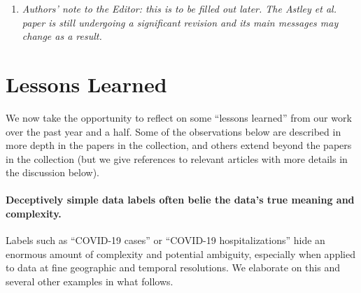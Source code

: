 \documentclass{article}
\begin{document}
\begin{enumerate}
\item \emph{Authors' note to the Editor: this is to be filled out later.  The
    Astley et al. paper is still undergoing a significant revision and its main
    messages may change as a result.}
\end{enumerate}

\section{Lessons Learned}

We now take the opportunity to reflect on some ``lessons learned'' from our work
over the past year and a half.  Some of the observations below are described in
more depth in the papers in the collection, and others extend beyond the papers
in the collection (but we give references to relevant articles with more details
in the discussion below). 

\paragraph{Deceptively simple data labels often belie the data's true meaning
  and complexity.}

Labels such as ``COVID-19 cases'' or ``COVID-19 hospitalizations'' hide an
enormous amount of complexity and potential ambiguity, especially when applied
to data at fine geographic and temporal resolutions.  We elaborate on this and
several other examples in what follows. 
\end{document}
